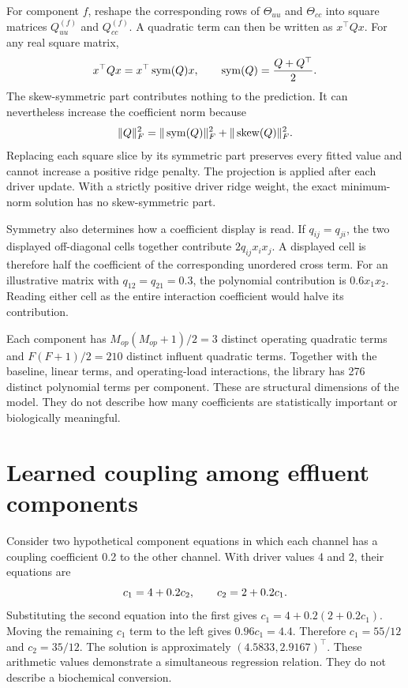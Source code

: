 For component \(f\), reshape the corresponding rows of \(\Theta_{uu}\) and \(\Theta_{cc}\) into square matrices \(Q_{uu}^{(f)}\) and \(Q_{cc}^{(f)}\). A quadratic term can then be written as \(x^\top Qx\). For any real square matrix,
\begin{equation}
\equationname{Symmetric representation of a quadratic form}
\label{eq:icsor_quadratic_symmetry}
x^\top Qx=x^\top\operatorname{sym}(Q)x,
\qquad
\operatorname{sym}(Q)=\frac{Q+Q^\top}{2}.
\end{equation}
The skew-symmetric part contributes nothing to the prediction. It can nevertheless increase the coefficient norm because
\begin{equation}
\equationname{Frobenius-norm decomposition into symmetric and skew parts}
\label{eq:icsor_quadratic_norm}
\|Q\|_F^2=
\|\operatorname{sym}(Q)\|_F^2+
\|\operatorname{skew}(Q)\|_F^2.
\end{equation}
Replacing each square slice by its symmetric part preserves every fitted value and cannot increase a positive ridge penalty. The projection is applied after each driver update. With a strictly positive driver ridge weight, the exact minimum-norm solution has no skew-symmetric part.

Symmetry also determines how a coefficient display is read. If \(q_{ij}=q_{ji}\), the two displayed off-diagonal cells together contribute \(2q_{ij}x_i x_j\). A displayed cell is therefore half the coefficient of the corresponding unordered cross term. For an illustrative matrix with \(q_{12}=q_{21}=0.3\), the polynomial contribution is \(0.6x_1x_2\). Reading either cell as the entire interaction coefficient would halve its contribution.

Each component has \(M_{op}(M_{op}+1)/2=3\) distinct operating quadratic terms and \(F(F+1)/2=210\) distinct influent quadratic terms. Together with the baseline, linear terms, and operating-load interactions, the library has 276 distinct polynomial terms per component. These are structural dimensions of the model. They do not describe how many coefficients are statistically important or biologically meaningful.

\section{Learned coupling among effluent components}

Consider two hypothetical component equations in which each channel has a coupling coefficient 0.2 to the other channel. With driver values 4 and 2, their equations are
\begin{equation}
\equationname{Illustrative coupled equations for two effluent components}
\label{eq:icsor_scalar_coupling_example}
c_1=4+0.2c_2,
\qquad c_2=2+0.2c_1.
\end{equation}
Substituting the second equation into the first gives \(c_1=4+0.2(2+0.2c_1)\). Moving the remaining \(c_1\) term to the left gives \(0.96c_1=4.4\). Therefore \(c_1=55/12\) and \(c_2=35/12\). The solution is approximately \((4.5833,2.9167)^\top\). These arithmetic values demonstrate a simultaneous regression relation. They do not describe a biochemical conversion.

